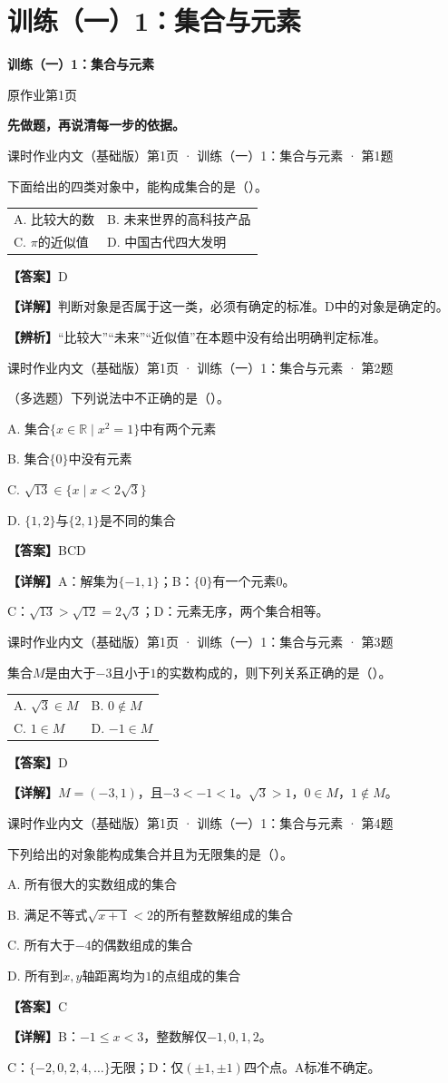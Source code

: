 \documentclass[UTF8,10pt,aspectratio=169]{ctexbeamer}
\makeatletter
\newcommand{\PageHeading}[1]{\begin{center}{\Large\bfseries #1}\end{center}\vspace{0.2cm}}
\newcommand{\Answer}[1]{\par\vspace{0.2cm}\textbf{【答案】}#1}
\newcommand{\Analysis}[1]{\par\vspace{0.2cm}\textbf{【详解】}#1}
\newcommand{\Choices}[4]{\par\vspace{0.2cm}\begin{tabular}{@{}p{0.47\textwidth}p{0.47\textwidth}@{}}A. #1 & B. #2 \\[0.15cm] C. #3 & D. #4\end{tabular}}
\newcommand{\R}{\mathbb R}
\newcommand{\Tip}[1]{\par\vspace{0.2cm}\textbf{【辨析】}#1}
\newcommand{\Source}[1]{{\scriptsize\color{gray}#1}\par\vspace{0.25cm}}
\makeatother
\begin{document}
\section{训练（一）1：集合与元素}
\begin{frame}
\PageHeading{训练（一）1：集合与元素}
原作业第1页\par\vspace{0.4cm}
\textbf{先做题，再说清每一步的依据。}
\end{frame}
\begin{frame}
\Source{课时作业内文（基础版）第1页 · 训练（一）1：集合与元素 · 第1题}
下面给出的四类对象中，能构成集合的是（\quad）。
\Choices{比较大的数}{未来世界的高科技产品}{$\pi$的近似值}{中国古代四大发明}
\pause
\Answer{D}
\Analysis{判断对象是否属于这一类，必须有确定的标准。D中的对象是确定的。}
\Tip{“比较大”“未来”“近似值”在本题中没有给出明确判定标准。}
\end{frame}
\begin{frame}
\Source{课时作业内文（基础版）第1页 · 训练（一）1：集合与元素 · 第2题}
（多选题）下列说法中不正确的是（\quad）。
\par A. 集合$\{x\in\R\mid x^2=1\}$中有两个元素
\par B. 集合$\{0\}$中没有元素
\par C. $\sqrt{13}\in\{x\mid x<2\sqrt3\}$
\par D. $\{1,2\}$与$\{2,1\}$是不同的集合
\pause
\Answer{BCD}
\Analysis{A：解集为$\{-1,1\}$；B：$\{0\}$有一个元素$0$。
\par C：$\sqrt{13}>\sqrt{12}=2\sqrt3$；D：元素无序，两个集合相等。}
\end{frame}
\begin{frame}
\Source{课时作业内文（基础版）第1页 · 训练（一）1：集合与元素 · 第3题}
集合$M$是由大于$-3$且小于$1$的实数构成的，则下列关系正确的是（\quad）。
\Choices{$\sqrt3\in M$}{$0\notin M$}{$1\in M$}{$-1\in M$}
\pause
\Answer{D}
\Analysis{$M=(-3,1)$，且$-3<-1<1$。$\sqrt3>1$，$0\in M$，$1\notin M$。}
\end{frame}
\begin{frame}
\Source{课时作业内文（基础版）第1页 · 训练（一）1：集合与元素 · 第4题}
下列给出的对象能构成集合并且为无限集的是（\quad）。
\par A. 所有很大的实数组成的集合
\par B. 满足不等式$\sqrt{x+1}<2$的所有整数解组成的集合
\par C. 所有大于$-4$的偶数组成的集合
\par D. 所有到$x,y$轴距离均为$1$的点组成的集合
\pause
\Answer{C}
\Analysis{B：$-1\le x<3$，整数解仅$-1,0,1,2$。
\par C：$\{-2,0,2,4,\ldots\}$无限；D：仅$(\pm1,\pm1)$四个点。A标准不确定。}
\end{frame}
\end{document}
